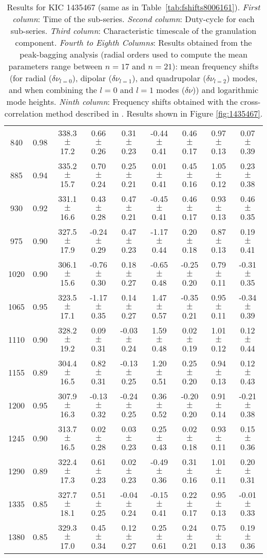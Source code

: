\documentclass[twocolumn]{aastex61}%
\begin{document}
\begin{table}
\begin{tabular}{ccc|ccccc|c}
840 & 0.98 & 338.3 $\pm$ 17.2 & 0.66 $\pm$ 0.26 & 0.31 $\pm$ 0.23 & -0.44 $\pm$ 0.41 & 0.46 $\pm$ 0.17 & 0.97 $\pm$ 0.13 & 0.07 $\pm$ 0.39\\
885 & 0.94 & 335.2 $\pm$ 15.7 & 0.70 $\pm$ 0.24 & 0.25 $\pm$ 0.21 & 0.01 $\pm$ 0.41 & 0.45 $\pm$ 0.16 & 1.05 $\pm$ 0.12 & 0.23 $\pm$ 0.38\\
930 & 0.92 & 331.1 $\pm$ 16.6 & 0.43 $\pm$ 0.28 & 0.47 $\pm$ 0.21 & -0.45 $\pm$ 0.41 & 0.46 $\pm$ 0.17 & 0.93 $\pm$ 0.13 & 0.46 $\pm$ 0.35\\
975 & 0.90 & 327.5 $\pm$ 17.9 & -0.24 $\pm$ 0.29 & 0.47 $\pm$ 0.23 & -1.17 $\pm$ 0.44 & 0.20 $\pm$ 0.18 & 0.87 $\pm$ 0.13 & 0.19 $\pm$ 0.41\\
1020 & 0.90 & 306.1 $\pm$ 15.6 & -0.76 $\pm$ 0.30 & 0.18 $\pm$ 0.27 & -0.65 $\pm$ 0.48 & -0.25 $\pm$ 0.20 & 0.79 $\pm$ 0.11 & -0.31 $\pm$ 0.35\\
1065 & 0.95 & 323.5 $\pm$ 17.1 & -1.17 $\pm$ 0.35 & 0.14 $\pm$ 0.27 & 1.47 $\pm$ 0.57 & -0.35 $\pm$ 0.21 & 0.95 $\pm$ 0.11 & -0.34 $\pm$ 0.39\\
1110 & 0.90 & 328.2 $\pm$ 19.2 & 0.09 $\pm$ 0.31 & -0.03 $\pm$ 0.24 & 1.59 $\pm$ 0.48 & 0.02 $\pm$ 0.19 & 1.01 $\pm$ 0.12 & 0.12 $\pm$ 0.44\\
1155 & 0.89 & 304.4 $\pm$ 16.5 & 0.82 $\pm$ 0.31 & -0.13 $\pm$ 0.25 & 1.20 $\pm$ 0.51 & 0.25 $\pm$ 0.20 & 0.94 $\pm$ 0.13 & 0.12 $\pm$ 0.43\\
1200 & 0.95 & 307.9 $\pm$ 16.3 & -0.13 $\pm$ 0.32 & -0.24 $\pm$ 0.25 & 0.36 $\pm$ 0.52 & -0.20 $\pm$ 0.20 & 0.91 $\pm$ 0.14 & -0.21 $\pm$ 0.38\\
1245 & 0.90 & 313.7 $\pm$ 16.5 & 0.02 $\pm$ 0.28 & 0.03 $\pm$ 0.23 & 0.25 $\pm$ 0.43 & 0.02 $\pm$ 0.18 & 0.93 $\pm$ 0.11 & 0.15 $\pm$ 0.36\\
1290 & 0.89 & 322.4 $\pm$ 17.3 & 0.61 $\pm$ 0.23 & 0.02 $\pm$ 0.23 & -0.49 $\pm$ 0.36 & 0.31 $\pm$ 0.16 & 1.01 $\pm$ 0.11 & 0.20 $\pm$ 0.31\\
1335 & 0.85 & 327.7 $\pm$ 18.1 & 0.51 $\pm$ 0.25 & -0.04 $\pm$ 0.24 & -0.15 $\pm$ 0.41 & 0.22 $\pm$ 0.17 & 0.95 $\pm$ 0.13 & -0.01 $\pm$ 0.33\\
1380 & 0.85 & 329.3 $\pm$ 17.0 & 0.45 $\pm$ 0.34 & 0.12 $\pm$ 0.27 & 0.25 $\pm$ 0.61 & 0.24 $\pm$ 0.21 & 0.75 $\pm$ 0.13 & 0.19 $\pm$ 0.36\\
\end{tabular}
\parbox{2\hsize}{\caption{Results for KIC 1435467 (same as in Table~\ref{tab:fshifts8006161}). {\it First column}: Time of the sub-series. {\it Second column}: Duty-cycle for each sub-series. {\it Third column}: Characteristic timescale of the granulation component. {\it Fourth to Eighth Columns}: Results obtained from the peak-bagging analysis (radial orders used to compute the mean parameters range between $n=17$ and $n=21$): mean frequency shifts (for radial ($\delta\nu_{l=0}$), dipolar ($\delta\nu_{l=1}$), and quadrupolar ($\delta\nu_{l=2}$) modes, and when combining the $l=0$ and $l=1$ modes ($\delta\nu$)) and logarithmic mode heights. {\it Ninth column}: Frequency shifts obtained with the cross-correlation method described in \citet{Kiefer2017}. Results shown in Figure \ref{fig:1435467}.}\label{tab:1435467}}
\end{table}
\end{document}
